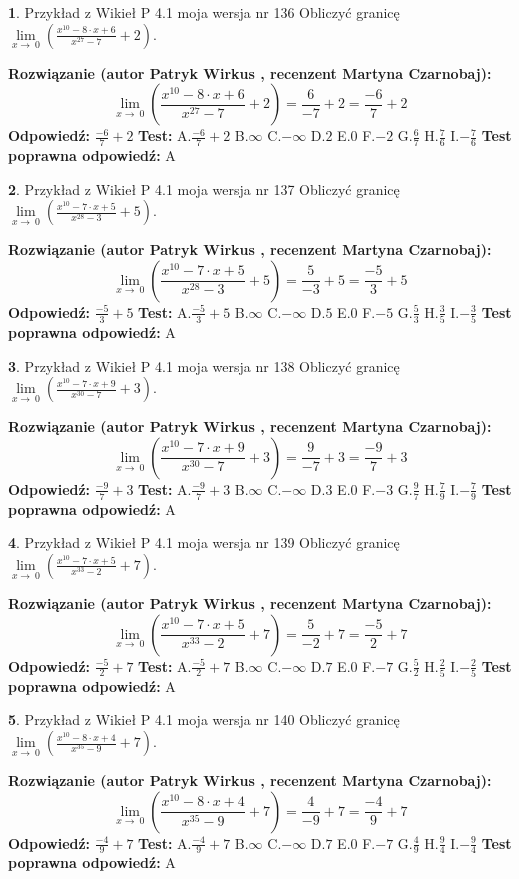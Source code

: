 \documentclass[12pt, a4paper]{article}
\theoremstyle{definition} %
\newtheorem{zad}{}
\newcommand{\zadStart}[1]{\begin{zad}#1\newline}
\newcommand{\zadStop}{\end{zad}}
\newcommand{\rozwStart}[2]{\noindent \textbf{Rozwiązanie (autor #1 , recenzent #2): }\newline}
\newcommand{\rozwStop}{\newline}
\newcommand{\odpStart}{\noindent \textbf{Odpowiedź:}\newline}
\newcommand{\odpStop}{\newline}
\newcommand{\testStart}{\noindent \textbf{Test:}\newline}
\newcommand{\testStop}{\newline}
\newcommand{\kluczStart}{\noindent \textbf{Test poprawna odpowiedź:}\newline}
\newcommand{\kluczStop}{\newline}
\begin{document}
\zadStart{Przykład z Wikieł P 4.1 moja wersja nr 136}
Obliczyć granicę $\lim\limits_{x\to\ 0}(\frac{x^{10}-8 \cdot x +6}{x^{27}-7}+2)$.
\zadStop
\rozwStart{Patryk Wirkus}{Martyna Czarnobaj}
$$\lim\limits_{x\to\ 0}(\frac{x^{10}-8 \cdot x +6}{x^{27}-7}+2)=\frac{6}{-7}+2=\frac{-6}{7}+2$$
\rozwStop
\odpStart
$\frac{-6}{7}+2$
\odpStop
\testStart
A.$\frac{-6}{7}+2$
B.$\infty$
C.$-\infty$
D.$2$
E.$0$
F.$-2$
G.$\frac{6}{7}$
H.$\frac{7}{6}$
I.$-\frac{7}{6}$
\testStop
\kluczStart
A
\kluczStop



\zadStart{Przykład z Wikieł P 4.1 moja wersja nr 137}
Obliczyć granicę $\lim\limits_{x\to\ 0}(\frac{x^{10}-7 \cdot x +5}{x^{28}-3}+5)$.
\zadStop
\rozwStart{Patryk Wirkus}{Martyna Czarnobaj}
$$\lim\limits_{x\to\ 0}(\frac{x^{10}-7 \cdot x +5}{x^{28}-3}+5)=\frac{5}{-3}+5=\frac{-5}{3}+5$$
\rozwStop
\odpStart
$\frac{-5}{3}+5$
\odpStop
\testStart
A.$\frac{-5}{3}+5$
B.$\infty$
C.$-\infty$
D.$5$
E.$0$
F.$-5$
G.$\frac{5}{3}$
H.$\frac{3}{5}$
I.$-\frac{3}{5}$
\testStop
\kluczStart
A
\kluczStop



\zadStart{Przykład z Wikieł P 4.1 moja wersja nr 138}
Obliczyć granicę $\lim\limits_{x\to\ 0}(\frac{x^{10}-7 \cdot x +9}{x^{30}-7}+3)$.
\zadStop
\rozwStart{Patryk Wirkus}{Martyna Czarnobaj}
$$\lim\limits_{x\to\ 0}(\frac{x^{10}-7 \cdot x +9}{x^{30}-7}+3)=\frac{9}{-7}+3=\frac{-9}{7}+3$$
\rozwStop
\odpStart
$\frac{-9}{7}+3$
\odpStop
\testStart
A.$\frac{-9}{7}+3$
B.$\infty$
C.$-\infty$
D.$3$
E.$0$
F.$-3$
G.$\frac{9}{7}$
H.$\frac{7}{9}$
I.$-\frac{7}{9}$
\testStop
\kluczStart
A
\kluczStop



\zadStart{Przykład z Wikieł P 4.1 moja wersja nr 139}
Obliczyć granicę $\lim\limits_{x\to\ 0}(\frac{x^{10}-7 \cdot x +5}{x^{33}-2}+7)$.
\zadStop
\rozwStart{Patryk Wirkus}{Martyna Czarnobaj}
$$\lim\limits_{x\to\ 0}(\frac{x^{10}-7 \cdot x +5}{x^{33}-2}+7)=\frac{5}{-2}+7=\frac{-5}{2}+7$$
\rozwStop
\odpStart
$\frac{-5}{2}+7$
\odpStop
\testStart
A.$\frac{-5}{2}+7$
B.$\infty$
C.$-\infty$
D.$7$
E.$0$
F.$-7$
G.$\frac{5}{2}$
H.$\frac{2}{5}$
I.$-\frac{2}{5}$
\testStop
\kluczStart
A
\kluczStop



\zadStart{Przykład z Wikieł P 4.1 moja wersja nr 140}
Obliczyć granicę $\lim\limits_{x\to\ 0}(\frac{x^{10}-8 \cdot x +4}{x^{35}-9}+7)$.
\zadStop
\rozwStart{Patryk Wirkus}{Martyna Czarnobaj}
$$\lim\limits_{x\to\ 0}(\frac{x^{10}-8 \cdot x +4}{x^{35}-9}+7)=\frac{4}{-9}+7=\frac{-4}{9}+7$$
\rozwStop
\odpStart
$\frac{-4}{9}+7$
\odpStop
\testStart
A.$\frac{-4}{9}+7$
B.$\infty$
C.$-\infty$
D.$7$
E.$0$
F.$-7$
G.$\frac{4}{9}$
H.$\frac{9}{4}$
I.$-\frac{9}{4}$
\testStop
\kluczStart
A
\kluczStop
\end{document}
